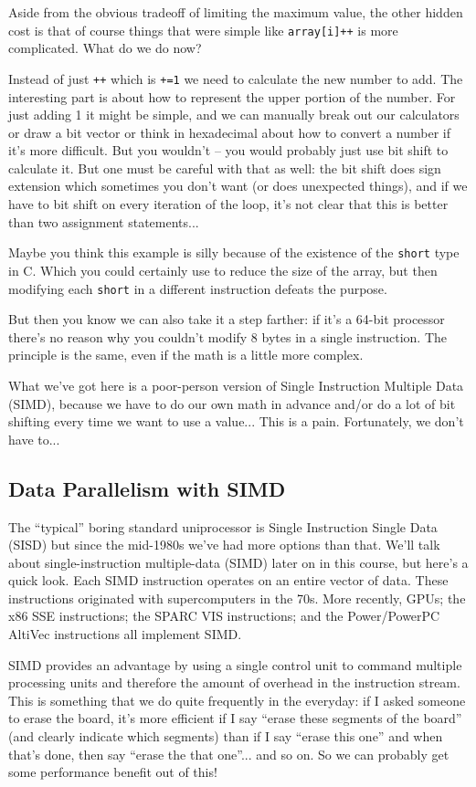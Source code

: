 \documentclass[a4paper]{report}
\begin{document}
Aside from the obvious tradeoff of limiting the maximum value, the other hidden cost is that of course things that were simple like \texttt{array[i]++} is more complicated. What do we do now?

Instead of just \texttt{++} which is \texttt{+=1} we need to calculate the new number to add. The interesting part is about how to represent the upper portion of the number. For just adding 1 it might be simple, and we can manually break out our calculators or draw a bit vector or think in hexadecimal about how to convert a number if it's more difficult. But you wouldn't -- you would probably just use bit shift to calculate it. But one must be careful with that as well: the bit shift does sign extension which sometimes you don't want (or does unexpected things), and if we have to bit shift on every iteration of the loop, it's not clear that this is better than two assignment statements...

Maybe you think this example is silly because of the existence of the \texttt{short} type in C. Which you could certainly use to reduce the size of the array, but then modifying each \texttt{short} in a different instruction defeats the purpose.

But then you know we can also take it a step farther: if it's a 64-bit processor there's no reason why you couldn't modify 8 bytes in a single instruction. The principle is the same, even if the math is a little more complex.

What we've got here is a poor-person version of Single Instruction Multiple Data (SIMD), because we have to do our own math in advance and/or do a lot of bit shifting every time we want to use a value... This is a pain. Fortunately, we don't have to...

\subsection*{Data Parallelism with SIMD}
The ``typical'' boring standard uniprocessor is Single Instruction Single Data (SISD) but since the mid-1980s we've had more options than that. We'll talk about single-instruction multiple-data (SIMD) later on in
this course, but here's a quick look. Each SIMD
instruction operates on an entire vector of data. These instructions
originated with supercomputers in the 70s. More recently, GPUs; the
x86 SSE instructions; the SPARC VIS instructions; and the
Power/PowerPC AltiVec instructions all implement SIMD.

SIMD provides an advantage by using a single control unit to command multiple processing units and therefore the amount of overhead in the instruction stream. This is something that we do quite frequently in the everyday: if I asked someone to erase the board, it's more efficient if I say ``erase these segments of the board'' (and clearly indicate which segments) than if I say ``erase this one'' and when that's done, then say ``erase the that one''... and so on. So we can probably get some performance benefit out of this!
\end{document}
